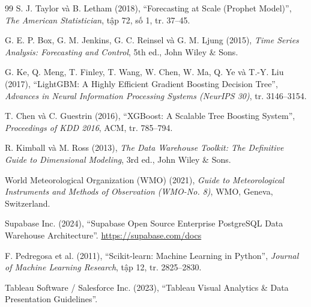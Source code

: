 \documentclass[12pt, a4paper]{report}
\begin{document}
\begin{thebibliography}{99}
S. J. Taylor và B. Letham (2018),
``Forecasting at Scale (Prophet Model)'',
\textit{The American Statistician}, tập 72, số 1, tr. 37--45.

G. E. P. Box, G. M. Jenkins, G. C. Reinsel và G. M. Ljung (2015),
\textit{Time Series Analysis: Forecasting and Control}, 5th ed., John Wiley \& Sons.

G. Ke, Q. Meng, T. Finley, T. Wang, W. Chen, W. Ma, Q. Ye và T.-Y. Liu (2017),
``LightGBM: A Highly Efficient Gradient Boosting Decision Tree'',
\textit{Advances in Neural Information Processing Systems (NeurIPS 30)}, tr. 3146--3154.

T. Chen và C. Guestrin (2016),
``XGBoost: A Scalable Tree Boosting System'',
\textit{Proceedings of KDD 2016}, ACM, tr. 785--794.

R. Kimball và M. Ross (2013),
\textit{The Data Warehouse Toolkit: The Definitive Guide to Dimensional Modeling}, 3rd ed., John Wiley \& Sons.

World Meteorological Organization (WMO) (2021),
\textit{Guide to Meteorological Instruments and Methods of Observation (WMO-No. 8)}, WMO, Geneva, Switzerland.

Supabase Inc. (2024),
``Supabase Open Source Enterprise PostgreSQL Data Warehouse Architecture''.
\url{https://supabase.com/docs}

F. Pedregosa et al. (2011),
``Scikit-learn: Machine Learning in Python'',
\textit{Journal of Machine Learning Research}, tập 12, tr. 2825--2830.

Tableau Software / Salesforce Inc. (2023),
``Tableau Visual Analytics \& Data Presentation Guidelines''.

\end{thebibliography}
\end{document}
